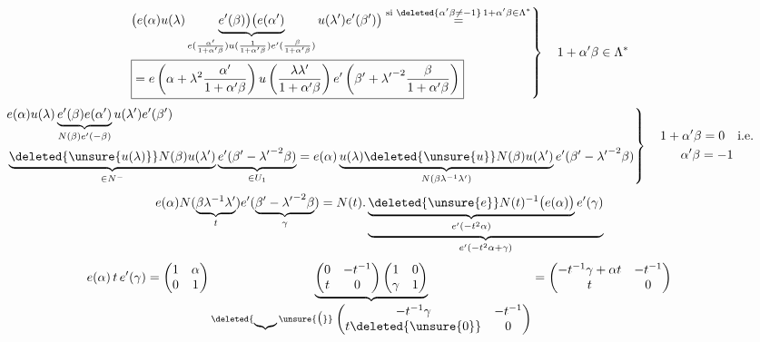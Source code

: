 \[
\left.\begin{aligned}
 &\bigl(e(\alpha)u(\lambda)\underbrace{e'(\beta)\bigr)\bigl(e(\alpha')}_{e(\frac{\alpha'}{1+\alpha'\beta})u(\frac{1}{1+\alpha'\beta})e'(\frac{\beta}{1+\alpha'\beta})}u(\lambda')e'(\beta')\bigr)
 \overset{\text{si }\deleted{\alpha'\beta\ne-1}\,1+\alpha'\beta\in\Lambda^*}{=}\\
 &\boxed{=e\left(\alpha+\lambda^2\frac{\alpha'}{1+\alpha'\beta}\right)
 u\left(\frac{\lambda\lambda'}{1+\alpha'\beta}\right)e'\left(\beta'+{\lambda'}^{-2}\frac{\beta}{1+\alpha'\beta}\right)}
\end{aligned}\right\}\quad 1+\alpha'\beta\in\Lambda^*
\]
\[
\left.\begin{aligned}
 &e(\alpha)u(\lambda)\underbrace{e'(\beta)e(\alpha')}_{N(\beta)e'(-\beta)}u(\lambda')e'(\beta')\\
 &\underbrace{\deleted{\unsure{u(\lambda)}}N(\beta)u(\lambda')}_{\in N^-}\underbrace{e'(\beta'-{\lambda'}^{-2}\beta)}_{\in U_1}
 =e(\alpha)\underbrace{u(\lambda)\deleted{\unsure{u}}N(\beta)u(\lambda')}_{N(\beta\lambda^{-1}\lambda')}e'(\beta'-{\lambda'}^{-2}\beta)
\end{aligned}\right\}\quad\begin{gathered}1+\alpha'\beta=0\quad\text{i.e.}\\\alpha'\beta=-1\end{gathered}
\]
\[
e(\alpha)N(\underbrace{\beta\lambda^{-1}\lambda'}_{t})e'(\underbrace{\beta'-{\lambda'}^{-2}\beta}_{\gamma})
=N(t).\underbrace{\underbrace{\deleted{\unsure{e}}N(t)^{-1}\bigl(e(\alpha)\bigr)}_{e'(-t^2\alpha)}e'(\gamma)}_{e'(-t^2\alpha+\gamma)}
\]
\[
e(\alpha)\,t\,e'(\gamma)=\begin{pmatrix}1&\alpha\\0&1\end{pmatrix}
\underbrace{\begin{pmatrix}0&-t^{-1}\\t&0\end{pmatrix}\begin{pmatrix}1&0\\\gamma&1\end{pmatrix}}_{\deleted{\underbrace{\hphantom{00}}\unsure{\bigl(}}\;\begin{pmatrix}-t^{-1}\gamma&-t^{-1}\\t\deleted{\unsure{0}}&0\end{pmatrix}}
=\begin{pmatrix}-t^{-1}\gamma+\alpha t&-t^{-1}\\t&0\end{pmatrix}
\]
